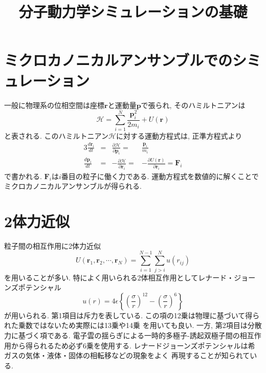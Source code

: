 





\title{分子動力学シミュレーションの基礎}
\maketitle

\section{ミクロカノニカルアンサンブルでのシミュレーション}
一般に物理系の位相空間は座標$\bm{r}$と運動量$\bm{p}$で張られ,
そのハミルトニアンは
\begin{equation}
 \mathcal{H}
 =
 \sum_{i=1}^{N} \frac{\bm{p}_{i}^{2}}{2 m_{i}} + U(\bm{r})
\end{equation}
と表される. このハミルトニアン$\mathcal{H}$に対する運動方程式は, 正準方程式より
\begin{alignat}{3}
   \frac{d \bm{r}_{i}}{dt}
&=&\frac{\partial{\mathcal{H}}}{\partial{\bm{p}_{i}}}
 =&\frac{\bm{p}_{i}}{m_{i}}
  \label{eq:HamiltonEq1}
   \\
   \frac{d \bm{p}_{i}}{dt}
&=&-\frac{\partial{\mathcal{H}}}{\partial{\bm{r}_{i}}}
 =&-\frac{\partial{U(\bm{r})}}{\partial{\bm{r}}_{i}}
 =\bm{F}_{i}
  \label{eq:HamiltonEq2}
\end{alignat}
で書かれる. $\bm{F}_{i}$は$i$番目の粒子に働く力である.
運動方程式を数値的に解くことでミクロカノニカルアンサンブルが得られる.

\section{2体力近似}
粒子間の相互作用に2体力近似
\begin{equation}
 U(\bm{r}_{1}, \bm{r}_{2}, \cdots, \bm{r}_{N})
=\sum_{i=1}^{N-1} \sum_{j > i}^{N} u(r_{ij})
\end{equation}
を用いることが多い.
特によく用いられる2体相互作用としてレナード・ジョーンズポテンシャル
\begin{equation}
 u(r)
=4\epsilon
  \left\{
          \left(\frac{\sigma}{r}\right)^{12}
         -\left(\frac{\sigma}{r}\right)^{6}
 \right\}
\end{equation}
が用いられる.
第1項目は斥力を表している.
この項の12乗は物理に基づいて得られた乗数ではないため実際には13乗や14乗
を用いても良い.
一方, 第2項目は分散力に基づく項である.
電子雲の揺らぎによる一時的多極子-誘起双極子間の相互作用から得られるため必ず6乗を使用する.
レナードジョーンズポテンシャルは希ガスの気体・液体・固体の相転移などの現象をよく
再現することが知られている.

